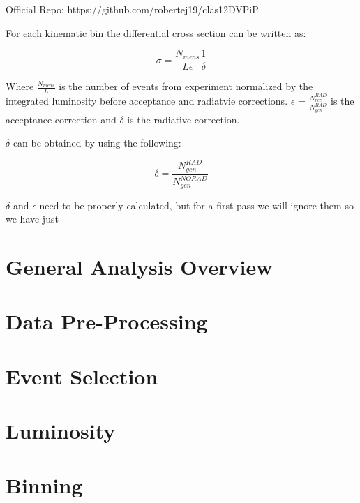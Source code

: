 

Official Repo: https://github.com/robertej19/clas12DVPiP
         


For each kinematic bin the differential cross section can be written as:

\begin{equation}
    \sigma = \frac{N_{meas}}{L \epsilon}\frac{1}{\delta}
\end{equation}

Where $\frac{N_{meas}}{L}$ is the number of events from experiment normalized by the integrated luminosity before acceptance and radiatvie corrections. $\epsilon$ = $\frac{N^{RAD}_{rec}}{{N^{RAD}_{gen}}}$ is the acceptance correction and $\delta$ is the radiative correction.



$\delta$ can be obtained by using the following:

\begin{equation}
    \delta = \frac{N^{RAD}_{gen}}{N^{NORAD}_{gen}}
\end{equation}

$\delta$ and $\epsilon$ need to be properly calculated, but for a first pass we will ignore them so we have just



\section{General Analysis Overview}
    
    
\section{Data Pre-Processing}
    

\section{Event Selection}
    
    
\section{Luminosity}\label{sec:luminosity}
    

\section{Binning}
    

